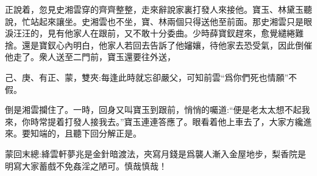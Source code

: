 \begin{parag}
    正說着，忽見史湘雲穿的齊齊整整，走來辭說家裏打發人來接他。寶玉、林黛玉聽說，忙站起來讓坐。史湘雲也不坐，寶、林兩個只得送他至前面。那史湘雲只是眼淚汪汪的，見有他家人在跟前，又不敢十分委曲。少時薛寶釵趕來，愈覺繾綣難捨。還是寶釵心內明白，他家人若回去告訴了他嬸孃，待他家去恐受氣，因此倒催他走了。衆人送至二門前，寶玉還要往外送，\begin{note}己、庚、有正、蒙，雙夾:每逢此時就忘卻嚴父，可知前雲“爲你們死也情願”不假。\end{note}倒是湘雲攔住了。一時，回身又叫寶玉到跟前，悄悄的囑道:“便是老太太想不起我來，你時常提着打發人接我去。”寶玉連連答應了。眼看着他上車去了，大家方纔進來。要知端的，且聽下回分解正是。
\end{parag}


\begin{parag}
    \begin{note}蒙回末總:絳雲軒夢兆是金針暗渡法，夾寫月錢是爲襲人漸入金屋地步，梨香院是明寫大家蓄戲不免姦淫之陋可。慎哉慎哉！\end{note}
\end{parag}

